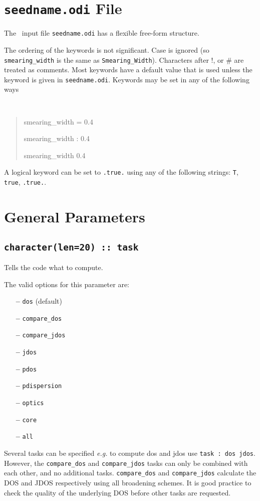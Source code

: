 \documentclass[a4paper,11pt,twoside]{book}
\begin{document}
{\section{{\tt seedname.odi} File}
The \optados\ input file {\tt seedname.odi} has a flexible free-form
structure.

The ordering of the keywords is not significant. Case is ignored (so
\verb#smearing_width# is the same as \verb#Smearing_Width#). Characters after !, or \#
are treated as comments. Most keywords have a default value that is
used unless the keyword is given in {\tt seedname.odi}. Keywords may be set
in any of the following ways
{\tt
\begin{quote}
smearing\_width = 0.4

smearing\_width : 0.4

smearing\_width   0.4
\end{quote} }
A logical keyword can be set to {\tt .true.} using any of the following
strings: {\tt T}, {\tt true}, {\tt .true.}.


\clearpage


\section{General Parameters}
\subsection[task]{\tt character(len=20) :: task}

Tells the code what to compute.

The valid options for this parameter are:
\begin{itemize}
\item[{\bf --}]  \verb#dos# (default)
\item[{\bf --}]  \verb#compare_dos#
\item[{\bf --}]  \verb#compare_jdos#
\item[{\bf --}]  \verb#jdos#
\item[{\bf --}]  \verb#pdos#
\item[{\bf --}]  \verb#pdispersion#
\item[{\bf --}]  \verb#optics#
\item[{\bf --}]  \verb#core#
\item[{\bf --}]  \verb#all#
\end{itemize}
Several tasks can be specified \emph{e.g.} to compute dos and jdos use
\verb#task : dos jdos#.
However, the \verb#compare_dos# and \verb#compare_jdos# tasks can only be combined with each other, and no additional tasks.
\verb#compare_dos# and \verb#compare_jdos# calculate the DOS and JDOS respectively using all broadening schemes. It is good practice to check the quality of the underlying DOS before other tasks are requested.

}
\end{document}
